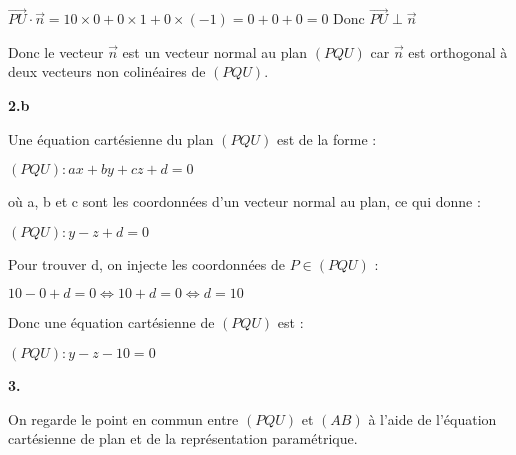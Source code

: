 \documentclass{article}
\begin{document}
\vspace{2mm}

$\overrightarrow{PU} \cdot \overrightarrow{n} = 10 \times 0 + 0 \times 1 + 0 \times (-1) = 0+0+0 = 0$ \quad Donc $\overrightarrow{PU} \perp \overrightarrow{n}$

\vspace{2mm}

\noindent Donc le vecteur $\overrightarrow{n}$ est un vecteur normal au plan $(PQU)$ car $\overrightarrow{n}$ est orthogonal à deux vecteurs non colinéaires de $(PQU)$. 
\vspace{2mm}

\vspace{6mm}
\textbf{2.b}
\vspace{2mm}

\noindent Une équation cartésienne du plan $(PQU)$ est de la forme :

\vspace{2mm}

$(PQU) : ax+ by + cz + d = 0$

\vspace{2mm}

\noindent  où a, b et c sont les coordonnées d'un vecteur normal au plan, ce qui donne :

\vspace{2mm}

$(PQU): y - z + d = 0$

\vspace{2mm}

\noindent  Pour trouver d, on injecte les coordonnées de $P \in (PQU)$ :

\vspace{2mm}

$10 - 0 + d = 0 \Leftrightarrow 10 + d = 0 \Leftrightarrow d = 10$

\vspace{2mm}

\noindent Donc une équation cartésienne de $(PQU)$ est :

\vspace{2mm}

$(PQU): y - z - 10 = 0$

\vspace{2mm}

\newpage

\textbf{3.}

\vspace{2mm}

\noindent On regarde le point en commun entre $(PQU)$ et $(AB)$ à l'aide de l'équation cartésienne de plan et de la représentation paramétrique.
\end{document}
